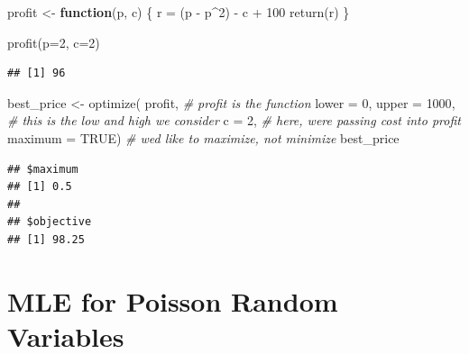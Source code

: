 \documentclass[
]{book}
\newenvironment{Shaded}{\begin{snugshade}}{\end{snugshade}}
\newcommand{\AttributeTok}[1]{\textcolor[rgb]{0.77,0.63,0.00}{#1}}
\newcommand{\CommentTok}[1]{\textcolor[rgb]{0.56,0.35,0.01}{\textit{#1}}}
\newcommand{\ConstantTok}[1]{\textcolor[rgb]{0.00,0.00,0.00}{#1}}
\newcommand{\ControlFlowTok}[1]{\textcolor[rgb]{0.13,0.29,0.53}{\textbf{#1}}}
\newcommand{\DecValTok}[1]{\textcolor[rgb]{0.00,0.00,0.81}{#1}}
\newcommand{\FunctionTok}[1]{\textcolor[rgb]{0.00,0.00,0.00}{#1}}
\newcommand{\NormalTok}[1]{#1}
\newcommand{\OtherTok}[1]{\textcolor[rgb]{0.56,0.35,0.01}{#1}}
\newcommand{\SpecialCharTok}[1]{\textcolor[rgb]{0.00,0.00,0.00}{#1}}
\theoremstyle{definition}
\theoremstyle{definition}
\theoremstyle{definition}
\theoremstyle{definition}
\theoremstyle{remark}
\begin{document}
\begin{Shaded}
\begin{Highlighting}[]
\NormalTok{profit }\OtherTok{\textless{}{-}} \ControlFlowTok{function}\NormalTok{(p, c) \{ }
\NormalTok{  r }\OtherTok{=}\NormalTok{ (p }\SpecialCharTok{{-}}\NormalTok{ p}\SpecialCharTok{\^{}}\DecValTok{2}\NormalTok{) }\SpecialCharTok{{-}}\NormalTok{ c }\SpecialCharTok{+} \DecValTok{100}
  \FunctionTok{return}\NormalTok{(r) }
\NormalTok{  \} }
\end{Highlighting}
\end{Shaded}

\begin{Shaded}
\begin{Highlighting}[]
\FunctionTok{profit}\NormalTok{(}\AttributeTok{p=}\DecValTok{2}\NormalTok{, }\AttributeTok{c=}\DecValTok{2}\NormalTok{)}
\end{Highlighting}
\end{Shaded}

\begin{verbatim}
## [1] 96
\end{verbatim}

\begin{Shaded}
\begin{Highlighting}[]
\NormalTok{best\_price }\OtherTok{\textless{}{-}} \FunctionTok{optimize}\NormalTok{(}
\NormalTok{  profit,                    }\CommentTok{\# profit is the function}
  \AttributeTok{lower =} \DecValTok{0}\NormalTok{, }\AttributeTok{upper =} \DecValTok{1000}\NormalTok{,   }\CommentTok{\# this is the low and high we consider}
  \AttributeTok{c =} \DecValTok{2}\NormalTok{,                     }\CommentTok{\# here, we\textquotesingle{}re passing cost into profit}
  \AttributeTok{maximum =} \ConstantTok{TRUE}\NormalTok{)            }\CommentTok{\# we\textquotesingle{}d like to maximize, not minimize}
\NormalTok{best\_price}
\end{Highlighting}
\end{Shaded}

\begin{verbatim}
## $maximum
## [1] 0.5
## 
## $objective
## [1] 98.25
\end{verbatim}

\hypertarget{mle-for-poisson-random-variables}{%
\section{MLE for Poisson Random Variables}\label{mle-for-poisson-random-variables}}
\end{document}
